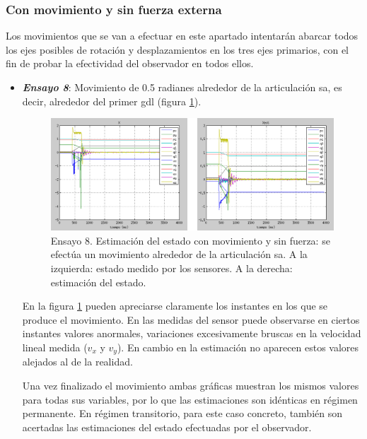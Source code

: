 \subsubsection{Con movimiento y sin fuerza externa}

Los movimientos que se van a efectuar en este apartado intentarán abarcar todos los ejes posibles de rotación y desplazamientos en los tres ejes primarios, con el fin de probar la efectividad del observador en todos ellos. \par 

\begin{itemize}

\item \textbf{\emph{Ensayo 8}}: Movimiento de 0.5 radianes alrededor de la articulación \acrshort{sa}, es decir, alrededor del primer \acrshort{gdl} (figura \ref{fig:cmsf-X-SA}).

\begin{figure}[h!]
\centering
\includegraphics[scale=0.4]{Figuras/cmsf-X-SA}
\caption[Ensayo 8. Estimación del estado con movimiento y sin fuerza]{Ensayo 8. Estimación del estado con movimiento y sin fuerza: se efectúa un movimiento alrededor de la articulación \acrshort{sa}. A la izquierda: estado medido por los sensores. A la derecha: estimación del estado.}
\label{fig:cmsf-X-SA}
\end{figure}

En la figura \ref{fig:cmsf-X-SA} pueden apreciarse claramente los instantes en los que se produce el movimiento. En las medidas del sensor puede observarse en ciertos instantes valores anormales, variaciones excesivamente bruscas en la velocidad lineal medida ($v_x$ y $v_y$). En cambio en la estimación no aparecen estos valores alejados al de la realidad. \par 

Una vez finalizado el movimiento ambas gráficas muestran los mismos valores para todas sus variables, por lo que las estimaciones son idénticas en régimen permanente. En régimen transitorio, para este caso concreto, también son acertadas las estimaciones del estado efectuadas por el observador. \par 


\end{itemize}
